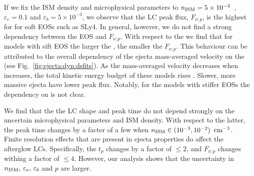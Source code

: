 If we fix the \ac{ISM} density and microphysical parameters to 
$n_{\text{ISM}}=5\times10^{-3}$~\gcm, $\varepsilon_e=0.1$ and $\varepsilon_b=5\times10^{-3}$, 
we observe that the \ac{LC} peak flux, $F_{\nu;p}$, is the highest for 
for soft \acp{EOS} such as SLy4. 
In general, however, we do not find a strong dependency between the \ac{EOS} and $F_{\nu;p}$.
With respect to the \mr{} we find that for models with sift \ac{EOS} the larger the \mr{},
the smaller the $F_{\nu;p}$. 
This behaviour can be attributed to the overall dependency of the ejecta mass-averaged 
velocity on the \mr{} (see Fig.~\ref{fig:ejecta:dyn:dsfits}).
As the mass-averaged velocity decreases when \mr{} increases, the 
total kinetic energy budget of these models rises .
Slower, more massive ejecta have lower peak flux.
Notably, for the models with stiffer \acp{EOS} the dependency on \mr{} is not clear. 

We find that the the \ac{LC} shape and peak time do not depend strongly on the 
uncertain microphysical parameters and \ac{ISM} density. With respect to the latter, 
the peak time changes by a facter of a few when $n_{\text{ISM}}\in(10^{-3},10^{-2})~\,\text{cm}^{-3}$.
Finite resolution effects that are present in ejecta properties do affect the 
afterglow \acp{LC}. Specifically, the $t_p$ changes by a factor of ${\leq2}$, 
and $F_{\nu;p}$ changes withing a factor of ${\leq4}$. However, our analysis 
shows that the uncertainty in $n_{\text{ISM}},\,\varepsilon_e,\,\varepsilon_b$ and $p$ are larger. 

